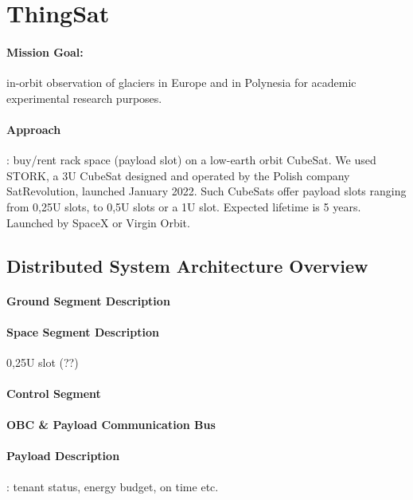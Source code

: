 \section{ThingSat}
\label{sec:case-study}

\paragraph*{Mission Goal:} in-orbit observation of glaciers in Europe and in Polynesia for academic experimental research purposes.
\paragraph*{Approach}: buy/rent rack space (payload slot) on a low-earth orbit CubeSat. We used STORK, a 3U CubeSat designed and operated by the Polish company SatRevolution, launched January 2022. Such CubeSats offer payload slots ranging from 0,25U slots, to 0,5U slots or a 1U slot. Expected lifetime is 5 years. Launched by SpaceX or Virgin Orbit.

\subsection{Distributed System Architecture Overview}
\paragraph*{Ground Segment Description}
\paragraph*{Space Segment Description} 0,25U slot (??)
\paragraph*{Control Segment} %
\paragraph*{OBC \& Payload Communication Bus}
\paragraph*{Payload Description}: tenant status, energy budget, on time etc.

